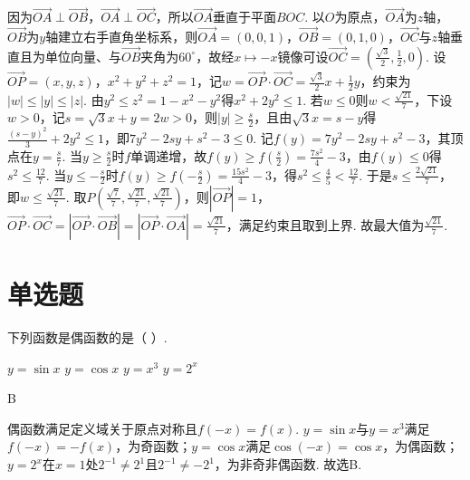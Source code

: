 \begin{solution}
因为\(\overrightarrow{OA}\perp\overrightarrow{OB}\)，\(\overrightarrow{OA}\perp\overrightarrow{OC}\)，所以\(\overrightarrow{OA}\)垂直于平面\(BOC\). 以\(O\)为原点，\(\overrightarrow{OA}\)为\(z\)轴，\(\overrightarrow{OB}\)为\(y\)轴建立右手直角坐标系，则\(\overrightarrow{OA}=(0,0,1)\)，\(\overrightarrow{OB}=(0,1,0)\)，\(\overrightarrow{OC}\)与\(z\)轴垂直且为单位向量、与\(\overrightarrow{OB}\)夹角为\(60^\circ\)，故经\(x\mapsto -x\)镜像可设\(\overrightarrow{OC}=\left(\frac{\sqrt{3}}{2},\frac12,0\right)\). 设\(\overrightarrow{OP}=(x,y,z)\)，\(x^2+y^2+z^2=1\)，记\(w=\overrightarrow{OP}\cdot\overrightarrow{OC}=\frac{\sqrt{3}}{2}x+\frac12y\)，约束为\(\left|w\right|\le \left|y\right|\le \left|z\right|\). 由\(y^2\le z^2=1-x^2-y^2\)得\(x^2+2y^2\le 1\). 若\(w\le 0\)则\(w<\frac{\sqrt{21}}{7}\)，下设\(w>0\)，记\(s=\sqrt{3}x+y=2w>0\)，则\(\left|y\right|\ge \frac{s}{2}\)，且由\(\sqrt{3}x=s-y\)得\(\frac{\left(s-y\right)^2}{3}+2y^2\le 1\)，即\(7y^2-2sy+s^2-3\le 0\). 记\(f(y)=7y^2-2sy+s^2-3\)，其顶点在\(y=\frac{s}{7}\). 当\(y\ge \frac{s}{2}\)时\(f\)单调递增，故\(f(y)\ge f\left(\frac{s}{2}\right)=\frac{7s^2}{4}-3\)，由\(f(y)\le 0\)得\(s^2\le \frac{12}{7}\). 当\(y\le -\frac{s}{2}\)时\(f(y)\ge f\left(-\frac{s}{2}\right)=\frac{15s^2}{4}-3\)，得\(s^2\le \frac45<\frac{12}{7}\). 于是\(s\le \frac{2\sqrt{21}}{7}\)，即\(w\le \frac{\sqrt{21}}{7}\). 取\(P\left(\frac{\sqrt{7}}{7},\frac{\sqrt{21}}{7},\frac{\sqrt{21}}{7}\right)\)，则\(\left|\overrightarrow{OP}\right|=1\)，\(\overrightarrow{OP}\cdot\overrightarrow{OC}=\left|\overrightarrow{OP}\cdot\overrightarrow{OB}\right|=\left|\overrightarrow{OP}\cdot\overrightarrow{OA}\right|=\frac{\sqrt{21}}{7}\)，满足约束且取到上界. 故最大值为\(\frac{\sqrt{21}}{7}\).
\end{solution}
\section{单选题}

\begin{problem}
下列函数是偶函数的是（ \quad ）.

\choices
    {\(y=\sin x\)}
    {\(y=\cos x\)}
    {\(y=x^3\)}
    {\(y=2^x\)}
\end{problem}

\begin{answer}
B
\end{answer}

\begin{solution}
偶函数满足定义域关于原点对称且\(f(-x)=f(x)\). \(y=\sin x\)与\(y=x^3\)满足\(f(-x)=-f(x)\)，为奇函数；\(y=\cos x\)满足\(\cos\left(-x\right)=\cos x\)，为偶函数；\(y=2^x\)在\(x=1\)处\(2^{-1}\ne 2^1\)且\(2^{-1}\ne -2^1\)，为非奇非偶函数. 故选B.
\end{solution}

